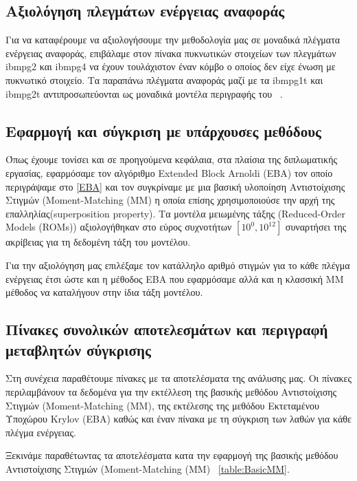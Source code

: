 \subsection{Αξιολόγηση πλεγμάτων ενέργειας αναφοράς}
Για να καταφέρουμε να αξιολογήσουμε την μεθοδολογία μας σε μοναδικά πλέγματα ενέργειας αναφοράς, επιβάλαμε στον πίνακα πυκνωτικών στοιχείων των πλεγμάτων \textlatin{ibmpg2} και \textlatin{ibmpg4} να έχουν τουλάχιστον έναν κόμβο ο οποίος δεν είχε ένωση με πυκνωτικό στοιχείο. Τα παραπάνω πλέγματα αναφοράς μαζί με τα \textlatin{ibmpg1t} και \textlatin{ibmpg2t} αντιπροσωπεύονται ως μοναδικά μοντέλα περιγραφής του ~\cite{nassif2008power}.

\subsection{Εφαρμογή και σύγκριση με υπάρχουσες μεθόδους}
Όπως έχουμε τονίσει και σε προηγούμενα κεφάλαια, στα πλαίσια της διπλωματικής εργασίας, εφαρμόσαμε τον αλγόριθμο \textlatin{Extended Block Arnoldi (EBA)} τον οποίο περιγράψαμε στο \ref{EBA} και τον συγκρίναμε με μια βασική υλοποίηση Αντιστοίχισης Στιγμών (\textlatin{Moment-Matching (MM)} η οποία επίσης χρησιμοποιούσε την αρχή της επαλληλίας(\textlatin{superposition property}). Τα μοντέλα μειωμένης τάξης (\textlatin{Reduced-Order Models (ROMs)}) αξιολογήθηκαν στο εύρος συχνοτήτων $[10^0, 10^{12}]$ συναρτήσει της ακρίβειας για τη δεδομένη τάξη του μοντέλου.

Για την αξιολόγηση μας επιλέξαμε τον κατάλληλο αριθμό στιγμών για το κάθε πλέγμα ενέργειας έτσι ώστε και η μέθοδος \textlatin{EBA} που εφαρμόσαμε αλλά και η κλασσική \textlatin{MM} μέθοδος να καταλήγουν στην ίδια τάξη μοντέλου.


\subsection{Πίνακες συνολικών αποτελεσμάτων και περιγραφή μεταβλητών σύγκρισης}

Στη συνέχεια παραθέτουμε πίνακες με τα αποτελέσματα της ανάλυσης μας. Οι πίνακες περιλαμβάνουν τα δεδομένα για την εκτέλλεση της βασικής μεθόδου Αντιστοίχισης Στιγμών (\textlatin{Moment-Matching (MM)}, της εκτέλεσης της μεθόδου Εκτεταμένου Υποχώρου \textlatin{Krylov} (\textlatin{EBA}) καθώς και έναν πίνακα με τη σύγκριση των λαθών για κάθε πλέγμα ενέργειας.

Ξεκινάμε παραθέτωντας τα αποτελέσματα κατα την εφαρμογή της βασικής μεθόδου Αντιστοίχισης Στιγμών (\textlatin{Moment-Matching (MM)} ~\ref{table:BasicMM}.

